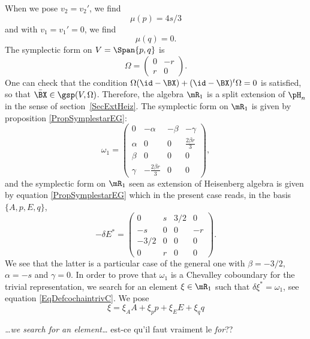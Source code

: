When we pose $v_2=v_2'$, we find
\begin{equation}
\mu(p)=4s/3
\end{equation}
and with $v_1=v_1'=0$, we find
\begin{equation}
\mu(q)=0.
\end{equation}
The symplectic form on $V=\Span\{ p,q \}$ is
\begin{equation}
 \Omega=\begin{pmatrix}
0&-r\\
r&0
\end{pmatrix}.
\end{equation}
One can check that the condition $\Omega(\id-\BX)+(\id-\BX)^{t}\Omega=0$ is satisfied, so that $\bar{\BX}\in\gsp(V,\Omega)$. Therefore, the algebra $\mR_{1}$ is a split extension of $\pH_{n}$ in the sense of section~\ref{SecExtHeiz}. The symplectic form on $\mR_1$ is given by proposition \eqref{PropSymplestarEG}:
 \begin{equation}
\omega_{1}=\begin{pmatrix}
0   &-\alpha        &-\beta &-\gamma\\
\alpha  &0          &0  &\frac{ 2\beta r }{ 3 }\\
\beta   &0          &0  &0\\
\gamma  &-\frac{ 2\beta r }{ 3 }    &0  &0
\end{pmatrix},
\end{equation}
and the symplectic form on $\mR_1$ seen as extension of Heisenberg algebra is given by equation \eqref{PropSymplestarEG} which in the present case reads, in the basis $\{ A,p,E,q \}$,
\begin{equation}
-\delta E^*=
\begin{pmatrix}
0&s&3/2&0\\
-s&0&0&-r\\
-3/2&0&0&0\\
0&r&0&0
\end{pmatrix}.
\end{equation}
We see that the latter is a particular case of the general one with $\beta=-3/2$, $\alpha=-s$ and $\gamma=0$. In order to prove that $\omega_{1}$ is a Chevalley coboundary for the trivial representation, we search for an element $\xi\in\mR_1$ such that $\delta\xi^*=\omega_{1}$, see equation \eqref{EqDefcochaintrivC}. We pose
\[
  \xi=\xi_{A}A+\xi_{p}p+\xi_{E}E+\xi_{q}q
\]

\begin{probleme}
\emph{\ldots we search for an element\ldots} est-ce qu'il faut vraiment le \emph{for}??
\end{probleme}


